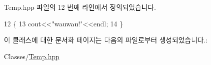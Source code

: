 Temp.\+hpp 파일의 12 번째 라인에서 정의되었습니다.


\begin{DoxyCode}
12                        \{
13         cout<<\textcolor{stringliteral}{"wauwau!"}<<endl;
14     \}
\end{DoxyCode}


이 클래스에 대한 문서화 페이지는 다음의 파일로부터 생성되었습니다.\+:\begin{DoxyCompactItemize}
\item 
Classes/\hyperlink{_temp_8hpp}{Temp.\+hpp}\end{DoxyCompactItemize}
